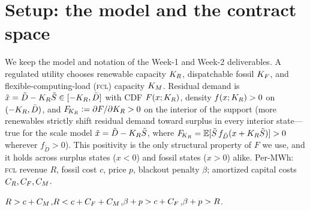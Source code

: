 \begin{abstract}
surplus rule and $\tau\to\infty$ the naive rule. Profit rises with $\tau$ (proved), and
carbon-optimality of surplus-only reduces, by an \emph{exact identity}
$C(\tau)-C(0)=\Phi(\tau)(1-\Lambda(\tau))$, to a single \emph{leverage} condition
$\Lambda\le1$ (the reduction proved; at interior optima $\Lambda\in[0.14,0.22]$---the
induced build-out offsets roughly a fifth of the load's footprint, not all of it): the contracts trace a monotone carbon--profit frontier with \emph{no free
lunch}. So Weeks~2 and~3 are not rival models but the carbon-worst and carbon-best corners
of one optimal-contract family, the regulator's reliability and participation requirements
selecting the point between. Throughout, the core decarbonization is
\emph{distributionally robust}: it holds for the worst-case demand law over the regularity
class, so the regulator needs no knowledge of $F$. Every identity is
checked against quadrature in \texttt{verify\_week3.py}. The message is clean: a flexible
computing load is a decarbonization instrument, and contract design is the lever that
makes it one.
\end{abstract}



\section{Setup: the model and the contract space}\label{r1w3-sec:setup}

We keep the model and notation of the Week-1 and Week-2 deliverables. A regulated
utility chooses renewable capacity $K_R$, dispatchable fossil $K_F$, and
flexible-computing-load (\textsc{fcl}) capacity $K_M$. Residual demand is
$\tilde x=\tilde D-K_R\tilde S\in[-K_R,\bar D]$ with CDF $F(x;K_R)$, density
$f(x;K_R)>0$ on $(-K_R,\bar D)$, and $F_{\!K_R}\vcentcolon=\partial F/\partial K_R>0$ on the
interior of the support (more renewables strictly shift residual demand toward surplus
in every interior state---true for the scale model $\tilde x=\tilde D-K_R\tilde S$,
where $F_{\!K_R}=\mathbb{E}[\tilde S\,f_{\tilde D}(x+K_R\tilde S)]>0$ wherever $f_{\tilde D}>0$). This
positivity is the only structural property of $F$ we use, and it holds across surplus
states ($x<0$) and fossil states ($x>0$) alike. Per-MWh: \textsc{fcl} revenue $R$,
fossil cost $c$, price $p$, blackout penalty $\beta$; amortized capital costs
$C_R,C_F,C_M$.

\begin{assumption}\label{r1w3-ass:reg}
$R>c+C_M$,\quad $R<c+C_F+C_M$,\quad $\beta+p>c+C_F$,\quad $\beta+p>R$.
\end{assumption}

